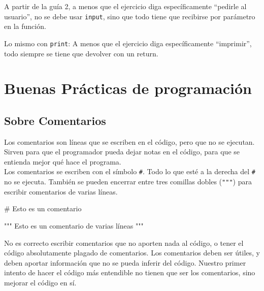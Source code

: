 \documentclass[
  letterpaper,
  DIV=11,
  numbers=noendperiod]{scrreprt}
\newenvironment{Shaded}{\begin{snugshade}}{\end{snugshade}}
\newcommand{\CommentTok}[1]{\textcolor[rgb]{0.37,0.37,0.37}{#1}}
\begin{document}
\begin{tcolorbox}[enhanced jigsaw, opacitybacktitle=0.6, toptitle=1mm, toprule=.15mm, arc=.35mm, breakable, bottomrule=.15mm, opacityback=0, leftrule=.75mm, rightrule=.15mm, title=\textcolor{quarto-callout-warning-color}{\faExclamationTriangle}\hspace{0.5em}{¡Cuidado!}, left=2mm, bottomtitle=1mm, colframe=quarto-callout-warning-color-frame, colback=white, titlerule=0mm, coltitle=black, colbacktitle=quarto-callout-warning-color!10!white]

A partir de la guía 2, a menos que el ejercicio diga específicamente
``pedirle al usuario'', no se debe usar \texttt{input}, sino que todo
tiene que recibirse por parámetro en la función.

Lo mismo con \texttt{print}: A menos que el ejercicio diga
específicamente ``imprimir'', todo siempre se tiene que devolver con un
return.

\end{tcolorbox}

\section{Buenas Prácticas de
programación}\label{buenas-pruxe1cticas-de-programaciuxf3n}

\subsection{Sobre Comentarios}\label{sobre-comentarios}

Los comentarios son líneas que se escriben en el código, pero que no se
ejecutan. Sirven para que el programador pueda dejar notas en el código,
para que se entienda mejor qué hace el programa.\\
Los comentarios se escriben con el símbolo \texttt{\#}. Todo lo que esté
a la derecha del \texttt{\#} no se ejecuta. También se pueden encerrar
entre tres comillas dobles (\texttt{"""}) para escribir comentarios de
varias líneas.

\begin{Shaded}
\begin{Highlighting}[]
\CommentTok{\# Esto es un comentario}

\CommentTok{""" Esto es un comentario}
\CommentTok{de varias líneas """}
\end{Highlighting}
\end{Shaded}

No es correcto escribir comentarios que no aporten nada al código, o
tener el código absolutamente plagado de comentarios. Los comentarios
deben ser útiles, y deben aportar información que no se pueda inferir
del código. Nuestro primer intento de hacer el código más entendible no
tienen que ser los comentarios, sino mejorar el código en sí.
\end{document}
